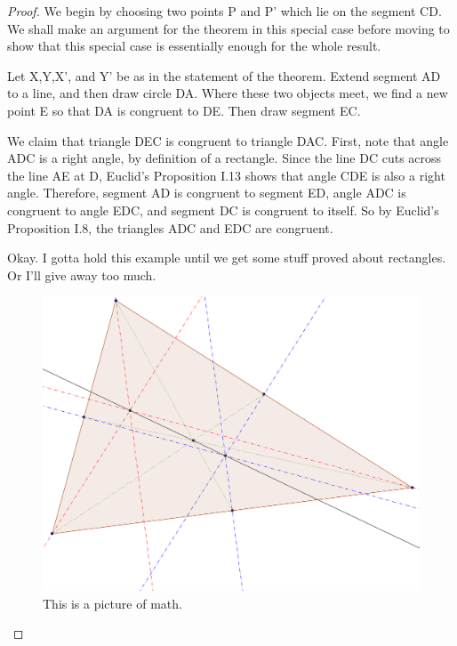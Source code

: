 \documentclass[12pt]{article}
\begin{document}
\begin{proof} We begin by choosing two points P and P' which lie on the segment CD. We shall make an argument for the theorem in this special case before moving to show that this special case is essentially enough for the whole result.

Let X,Y,X', and Y' be as in the statement of the theorem. Extend segment AD to a line, and then draw circle DA. Where these two objects meet, we find a new point E so that DA is congruent to DE. Then draw segment EC.

We claim that triangle DEC is congruent to triangle DAC. First, note that angle ADC is a right angle, by definition of a rectangle. Since the line DC cuts across the line AE at D, Euclid's Proposition I.13 shows that angle CDE is also a right angle. Therefore, segment AD is congruent to segment ED, angle ADC is congruent to angle EDC, and segment DC is congruent to itself. So by Euclid's Proposition I.8, the triangles ADC and EDC are congruent.


Okay. I gotta hold this example until we get some stuff proved about rectangles. Or I'll give away too much.

\begin{figure}[ht]
\centering
\includegraphics[width=.5\textwidth]{TEG_cover.png}
\caption{This is a picture of math.}
\end{figure}



\end{proof}
\end{document}
